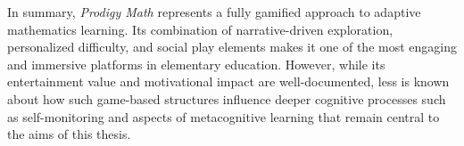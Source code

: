 In summary, \textit{Prodigy Math} represents a fully gamified approach to adaptive mathematics learning. Its combination of narrative-driven exploration, personalized difficulty, and social play elements makes it one of the most engaging and immersive platforms in elementary education. However, while its entertainment value and motivational impact are well-documented, less is known about how such game-based structures influence deeper cognitive processes such as self-monitoring and aspects of metacognitive learning that remain central to the aims of this thesis.



